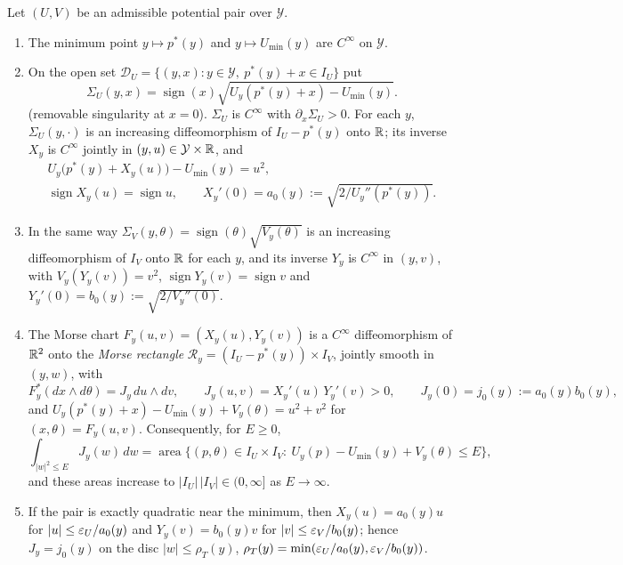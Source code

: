 \begin{lemma}\label{lem:pln-morse-inverse}
Let $(U,V)$ be an admissible potential pair over $\mathcal Y$.
\begin{enumerate}[label=(\roman*)]
\item The minimum point $y\mapsto p^*(y)$ and $y\mapsto U_{\min}(y)$ are $C^\infty$ on $\mathcal Y$.
\item On the open set $\mathcal D_U=\{(y,x):y\in\mathcal Y,\ p^*(y)+x\in I_U\}$ put
 \[
  \Sigma_U(y,x)=\operatorname{sign}(x)\sqrt{U_y(p^*(y)+x)-U_{\min}(y)}.
 \]
 (removable singularity at $x=0$). $\Sigma_U$ is $C^\infty$ with
 $\partial_x\Sigma_U>0$. For each $y$, $\Sigma_U(y,\cdot)$ is an increasing diffeomorphism of
 $I_U-p^*(y)$ onto $\mathbb{R}$; its inverse $X_y$ is $C^\infty$ jointly in $(y,u)\in\mathcal Y\times\mathbb{R}$, and
 \begin{gather*}
  U_y\bigl(p^*(y)+X_y(u)\bigr)-U_{\min}(y)=u^2,\\
  \operatorname{sign}X_y(u)=\operatorname{sign}u,\qquad
  X_y'(0)=a_0(y):=\sqrt{2/U_y''(p^*(y))} .
 \end{gather*}
\item In the same way $\Sigma_V(y,\theta)=\operatorname{sign}(\theta)\sqrt{V_y(\theta)}$
 is an increasing diffeomorphism of $I_V$ onto $\mathbb{R}$ for each $y$, and its inverse $Y_y$ is $C^\infty$ in
 $(y,v)$, with $V_y(Y_y(v))=v^2$, $\operatorname{sign}Y_y(v)=\operatorname{sign}v$ and
 $Y_y'(0)=b_0(y):=\sqrt{2/V_y''(0)}$.
\item The Morse chart $F_y(u,v)=(X_y(u),Y_y(v))$ is a $C^\infty$ diffeomorphism of $\mathbb{R}^2$ onto the
 \emph{Morse rectangle} $\mathcal R_y=(I_U-p^*(y))\times I_V$, jointly smooth in $(y,w)$, with
 \[
  F_y^*(dx\wedge d\theta)=J_y\,du\wedge dv,\qquad J_y(u,v)=X_y'(u)\,Y_y'(v)>0,\qquad J_y(0)=j_0(y):=a_0(y)b_0(y),
 \]
 and $U_y(p^*(y)+x)-U_{\min}(y)+V_y(\theta)=u^2+v^2$ for $(x,\theta)=F_y(u,v)$. Consequently, for $E\ge0$,
 \[
  \int_{|w|^2\le E}J_y(w)\,dw=\operatorname{area}\bigl\{(p,\theta)\in I_U\times I_V:\ U_y(p)-U_{\min}(y)+V_y(\theta)\le E\bigr\},
 \]
 and these areas increase to $|I_U|\,|I_V|\in(0,\infty]$ as $E\to\infty$.
\item If the pair is exactly quadratic near the minimum, then $X_y(u)=a_0(y)u$ for $|u|\le\varepsilon_U/a_0(y)$
 and $Y_y(v)=b_0(y)v$ for $|v|\le\varepsilon_V/b_0(y)$; hence $J_y=j_0(y)$ on the disc $|w|\le\rho_T(y)$,
 $\rho_T(y)=\min(\varepsilon_U/a_0(y),\varepsilon_V/b_0(y))$.
\end{enumerate}
\end{lemma}

